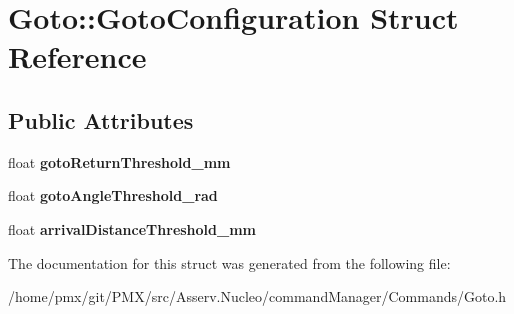 \hypertarget{structGoto_1_1GotoConfiguration}{}\section{Goto\+:\+:Goto\+Configuration Struct Reference}
\label{structGoto_1_1GotoConfiguration}
\subsection*{Public Attributes}
\begin{DoxyCompactItemize}
\item 
\mbox{\label{structGoto_1_1GotoConfiguration_ad53f0dc9686484b9f3178a36fabf3edc}} 
float {\bfseries goto\+Return\+Threshold\+\_\+mm}
\item 
\mbox{\label{structGoto_1_1GotoConfiguration_af9d29d11f5d979e00497efbbc0e36e02}} 
float {\bfseries goto\+Angle\+Threshold\+\_\+rad}
\item 
\mbox{\label{structGoto_1_1GotoConfiguration_a49573bd826592b0b25e8ae58ec43e1e6}} 
float {\bfseries arrival\+Distance\+Threshold\+\_\+mm}
\end{DoxyCompactItemize}


The documentation for this struct was generated from the following file\+:\begin{DoxyCompactItemize}
\item 
/home/pmx/git/\+P\+M\+X/src/\+Asserv.\+Nucleo/command\+Manager/\+Commands/Goto.\+h\end{DoxyCompactItemize}
